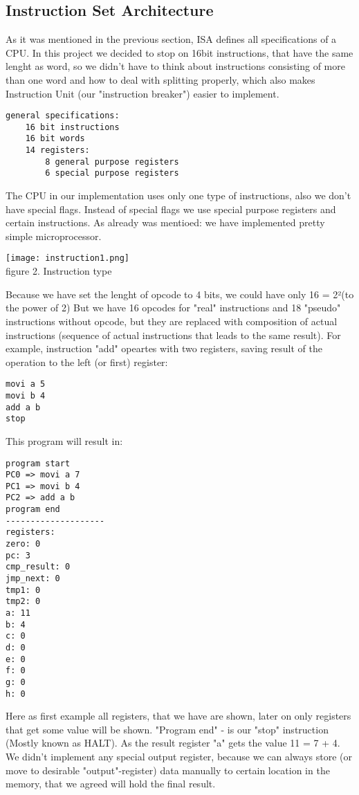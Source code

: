 \documentclass[11pt,a4paper]{article}
\begin{document}
\subsection{Instruction Set Architecture}
As it was mentioned in the previous section, ISA defines all specifications of a CPU. In this project we decided to stop on 16bit instructions, that have the same lenght as word, so we didn't have to think about instructions consisting of more than one word and how to deal with splitting properly, which also makes Instruction Unit (our "instruction breaker") easier to implement.
\begin{verbatim}
general specifications:
	16 bit instructions
	16 bit words
	14 registers:
		8 general purpose registers
		6 special purpose registers
\end{verbatim}
The CPU in our implementation uses only one type of instructions, also we don't have special flags. Instead of special flags we use special purpose registers and certain instructions. As already was mentioed: we have implemented pretty simple microprocessor.
\begin{center}
\texttt{[image: instruction1.png]}\\
figure 2. Instruction type
\end{center}
Because we have set the lenght of opcode to 4 bits, we could have only 16 = 2²(to the power of 2) But we have 16 opcodes for "real" instructions and 18 "pseudo" instructions without opcode, but they are replaced with composition of actual instructions (sequence of actual instructions that leads to the same result). For example, instruction "add" opeartes with two registers, saving result of the operation to the left (or first) register:
\begin{verbatim}
movi a 5
movi b 4
add a b
stop
\end{verbatim}
This program will result in:
\begin{verbatim}
program start
PC0 => movi a 7
PC1 => movi b 4
PC2 => add a b
program end
--------------------
registers:
zero: 0
pc: 3
cmp_result: 0
jmp_next: 0
tmp1: 0
tmp2: 0
a: 11
b: 4
c: 0
d: 0
e: 0
f: 0
g: 0
h: 0
\end{verbatim}
Here as first example all registers, that we have are shown, later on only registers that get some value will be shown. "Program end" - is our "stop" instruction (Mostly known as HALT). As the result register "a" gets the value 11 = 7 + 4. We didn't implement any special output register, because we can always store (or move to desirable "output"-register) data manually to certain location in the memory, that we agreed will hold the final result.\\
\end{document}
